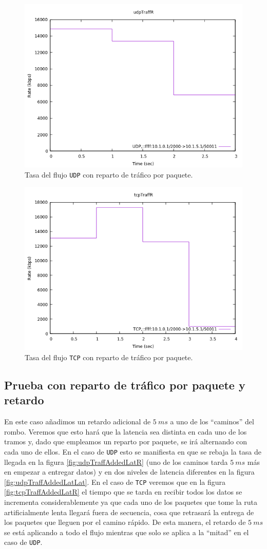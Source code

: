 \documentclass[11pt]{article}
\begin{document}
                \begin{figure}
                    \centering
                    \includegraphics[width=0.6\linewidth]{udpTraffPPR.png}
                    \caption{Tasa del flujo \texttt{UDP} con reparto de tráfico por paquete.}
                    \label{fig:udpTraffPPR}
                \end{figure}

                \begin{figure}
                    \centering
                    \includegraphics[width=0.6\linewidth]{tcpTraffPPR.png}
                    \caption{Tasa del flujo \texttt{TCP} con reparto de tráfico por paquete.}
                    \label{fig:tcpTraffPPR}
                \end{figure}

            \subsection{Prueba con reparto de tráfico por paquete y retardo}
                En este caso añadimos un retardo adicional de $5\ ms$ a uno de los ``caminos'' del rombo. Veremos que esto hará que la latencia sea distinta en cada uno de los tramos y, dado que empleamos un reparto por paquete, se irá alternando con cada uno de ellos. En el caso de \texttt{UDP} esto se manifiesta en que se rebaja la tasa de llegada en la figura \ref{fig:udpTraffAddedLatR} (uno de los caminos tarda $5\ ms$ más en empezar a entregar datos) y en dos niveles de latencia diferentes en la figura \ref{fig:udpTraffAddedLatLat}. En el caso de \texttt{TCP} veremos que en la figura \ref{fig:tcpTraffAddedLatR} el tiempo que se tarda en recibir todos los datos se incrementa considerablemente ya que cada uno de los paquetes que tome la ruta artificialmente lenta llegará fuera de secuencia, cosa que retrasará la entrega de los paquetes que lleguen por el camino rápido. De esta manera, el retardo de $5\ ms$ se está aplicando a todo el flujo mientras que solo se aplica a la ``mitad'' en el caso de \texttt{UDP}.
\end{document}
